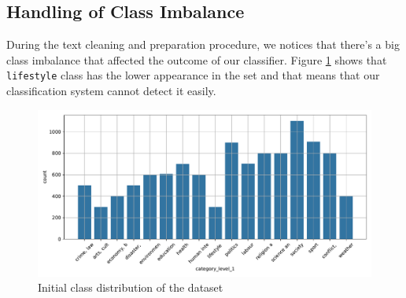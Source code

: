 \subsection{Handling of Class Imbalance}
During the text cleaning and preparation procedure, we notices that there's a big class imbalance that affected the outcome of our classifier. Figure \ref{fig:initial_class_distribution} shows that \verb|lifestyle| class has the lower appearance in the set and that means that our classification system cannot detect it easily.

\begin{figure}[htpb]
	\centering
	\includegraphics[width=\linewidth]{Images/initial_class_distribution.pdf}
	\caption{Initial class distribution of the dataset}
	\label{fig:initial_class_distribution}
\end{figure}

